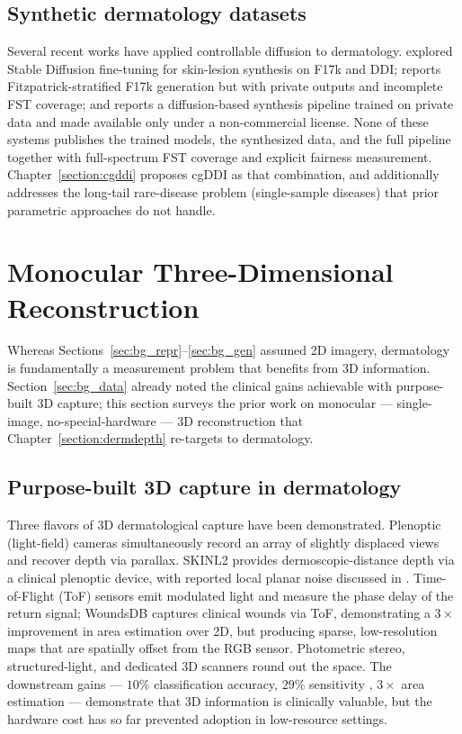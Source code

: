 \documentclass[11pt]{ucthesis}
\begin{document}
\subsection{Synthetic dermatology datasets}

Several recent works have applied controllable diffusion to dermatology. \cite{sagers-2023} explored Stable Diffusion fine-tuning for skin-lesion synthesis on F17k and DDI; \cite{wang-2024} reports Fitzpatrick-stratified F17k generation but with private outputs and incomplete FST coverage; and \cite{ktena-2024} reports a diffusion-based synthesis pipeline trained on private data and made available only under a non-commercial license. None of these systems publishes the trained models, the synthesized data, and the full pipeline together with full-spectrum FST coverage and explicit fairness measurement. Chapter~\ref{section:cgddi} proposes cgDDI as that combination, and additionally addresses the long-tail rare-disease problem (single-sample diseases) that prior parametric approaches do not handle.

\section{Monocular Three-Dimensional Reconstruction}
\label{sec:bg_3d}

Whereas Sections~\ref{sec:bg_repr}--\ref{sec:bg_gen} assumed 2D imagery, dermatology is fundamentally a measurement problem that benefits from 3D information. Section~\ref{sec:bg_data} already noted the clinical gains achievable with purpose-built 3D capture; this section surveys the prior work on monocular --- single-image, no-special-hardware --- 3D reconstruction that Chapter~\ref{section:dermdepth} re-targets to dermatology.

\subsection{Purpose-built 3D capture in dermatology}

Three flavors of 3D dermatological capture have been demonstrated. Plenoptic (light-field) cameras simultaneously record an array of slightly displaced views and recover depth via parallax. SKINL2 \cite{de-faria-2019} provides dermoscopic-distance depth via a clinical plenoptic device, with reported local planar noise discussed in \cite{lourenco-2022}. Time-of-Flight (ToF) sensors emit modulated light and measure the phase delay of the return signal; WoundsDB \cite{juszczyk-2020} captures clinical wounds via ToF, demonstrating a $3\times$ improvement in area estimation over 2D, but producing sparse, low-resolution maps that are spatially offset from the RGB sensor. Photometric stereo, structured-light, and dedicated 3D scanners round out the space. The downstream gains --- $10\%$ classification accuracy, $29\%$ sensitivity \cite{pereira-2021}, $3\times$ area estimation \cite{juszczyk-2020} --- demonstrate that 3D information is clinically valuable, but the hardware cost has so far prevented adoption in low-resource settings.
\end{document}
